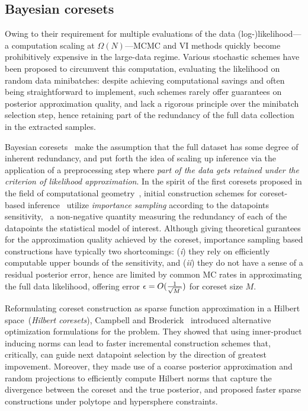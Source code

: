 \subsection{Bayesian coresets}
\label{subsec:b-coresets}
Owing to their requirement for multiple evaluations of the data (log-)likelihood---a computation scaling at $\Omega(N)$---MCMC and VI methods quickly become prohibitively expensive in the large-data regime. Various stochastic schemes have been proposed to circumvent this computation, evaluating the likelihood on random data minibatches: despite achieving computational savings and often being straightforward to implement, such schemes rarely offer guarantees on posterior approximation quality, and lack a rigorous principle over the minibatch selection step, hence retaining part of the redundancy of the full data collection in the extracted samples.

Bayesian coresets~\citep{huggins16,campbell18,campbell19jmlr,campbell19neurips} make the assumption that the full dataset has some degree of inherent redundancy, and put forth the idea of scaling up inference via the application of a preprocessing step where \emph{part of the data gets retained under the criterion of likelihood approximation}. In the spirit of the first coresets proposed in the field of computational geometry~\citep{feldman11unified}, initial construction schemes for coreset-based \mbox{inference~\citep{huggins16,lucic17training}} utilize \emph{importance sampling} according to the datapoints sensitivity, \ie~a non-negative quantity measuring the redundancy of each of the datapoints \wrt the statistical model of interest. Although giving theoretical gurantees for the approximation quality achieved by the coreset, importance sampling based constructions have typically two shortcomings: (\emph{i}) they rely on efficiently computable upper bounds of the sensitivity, and (\emph{ii}) they do not have a sense of a residual posterior error, hence are limited by common MC rates in approximating the full data likelihood, offering error $\eps = O(\frac{1}{\sqrt{M}})$ for coreset size $M$.

Reformulating coreset construction as sparse function approximation in a Hilbert space~(\emph{Hilbert coresets}), Campbell and Broderick~\citep{campbell18,campbell19jmlr} introduced alternative optimization formulations for the problem. They showed that using inner-product inducing norms can lead to faster incremental construction schemes that, critically, can guide next datapoint selection by the direction of greatest impovement. Moreover, they made use of a coarse posterior approximation and random projections to efficiently compute Hilbert norms that capture the divergence between the coreset and the true posterior, and proposed faster sparse constructions under polytope and hypersphere constraints.

